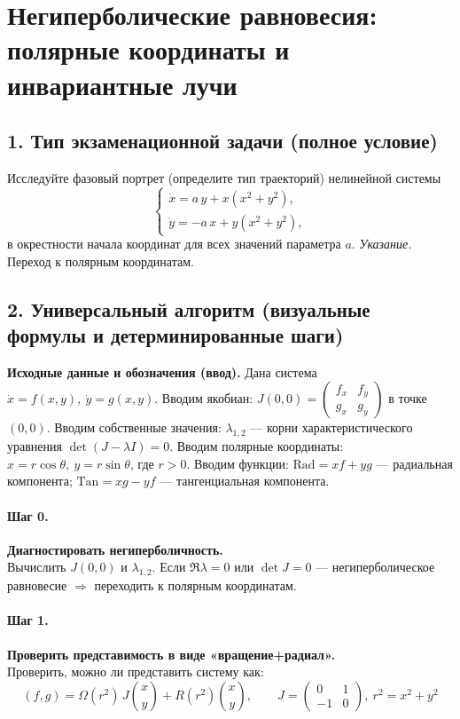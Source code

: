 \section{Негиперболические равновесия: полярные координаты и инвариантные лучи}

\subsection*{1. Тип экзаменационной задачи (полное условие)}
Исследуйте фазовый портрет (определите тип траекторий) нелинейной системы
\[
\begin{cases}
\dot{x}=a\,y+x(x^{2}+y^{2}),\\[2pt]
\dot{y}=-a\,x+y(x^{2}+y^{2}),
\end{cases}
\]
в окрестности начала координат для всех значений параметра \(a\).
\textit{Указание.} Переход к полярным координатам.

\subsection*{2. Универсальный алгоритм (визуальные формулы и детерминированные шаги)}

\textbf{Исходные данные и обозначения (ввод).} Дана система \(\dot x=f(x,y),\ \dot y=g(x,y)\).
Вводим якобиан: \(J(0,0)=\begin{pmatrix}f_x&f_y\\ g_x&g_y\end{pmatrix}\) в точке \((0,0)\).
Вводим собственные значения: \(\lambda_{1,2}\) — корни характеристического уравнения \(\det(J-\lambda I)=0\).
Вводим полярные координаты: \(x=r\cos\theta,\ y=r\sin\theta\), где \(r>0\).
Вводим функции: \(\text{Rad}=x f+y g\) — радиальная компонента; \(\text{Tan}=x g-y f\) — тангенциальная компонента.

\paragraph{Шаг 0.} \textbf{Диагностировать негиперболичность.}\\
Вычислить \(J(0,0)\) и \(\lambda_{1,2}\). Если \(\Re\lambda=0\) или \(\det J=0\) — негиперболическое равновесие \(\Rightarrow\) переходить к полярным координатам.

\paragraph{Шаг 1.} \textbf{Проверить представимость в виде «вращение+радиал».}\\
Проверить, можно ли представить систему как:
\[
(f,g)=\Omega(r^{2})\,J\!\binom{x}{y}+R(r^{2})\!\binom{x}{y},\qquad
J=\begin{pmatrix}0&1\\-1&0\end{pmatrix},\ r^{2}=x^{2}+y^{2}
\]

